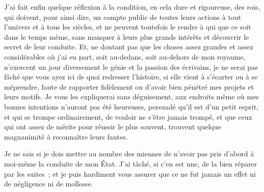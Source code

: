 \documentclass[french,twoside]{book} %
\begin{document}
J’ai fait enfin quelque réflexion à la condition, en cela dure et rigoureuse, des rois, qui doivent, pour ainsi dire, un compte public de toutes leurs actions à tout l’univers et à tous les siècles, et ne peuvent toutefois le rendre à qui que ce soit dans le temps même, sans manquer à leurs plus grands intérêts et découvrir le secret de leur conduite. Et, ne doutant pas que les choses assez grandes et assez considérables où j’ai eu part, soit au-dedans, soit au-dehors de mon royaume, n’exercent un jour diversement le génie et la passion des écrivains, je ne serai pas fâché que vous ayez ici de quoi redresser l’histoire, si elle vient à s’écarter ou à se méprendre, faute de rapporter fidèlement ou d’avoir bien pénétré mes projets et leurs motifs. Je vous les expliquerai sans déguisement, aux endroits même où mes bonnes intentions n’auront pas été heureuses, persuadé qu’il est d’un petit esprit, et qui se trompe ordinairement, de vouloir ne s’être jamais trompé, et que ceux qui ont assez de mérite pour réussir le plus souvent, trouvent quelque magnanimité à reconnaître leurs fautes.\par
Je ne sais si je dois mettre au nombre des miennes de n’avoir pas pris d’abord à moi-même la conduite de mon État. J’ai tâché, si c’en est une, de la bien réparer par les suites ; et je puis hardiment vous assurer que ce ne fut jamais un effet ni de négligence ni de mollesse.\par
\end{document}
